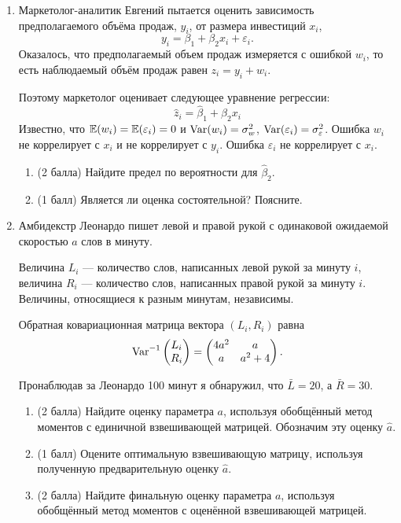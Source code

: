 \begin{enumerate}
    \item Маркетолог-аналитик Евгений пытается оценить зависимость предполагаемого объёма продаж, $y_i$, от размера инвестиций $x_i$,
\[    
y_i = \beta_1 + \beta_2 x_i + \varepsilon_i.
\]
Оказалось, что предполагаемый объем продаж измеряется с ошибкой $w_i$, то есть наблюдаемый объём продаж равен $z_i = y_i + w_i$.   

Поэтому маркетолог оценивает следующее уравнение регрессии:
\[ 
\hat z_i = \hat\beta_1 + \hat\beta_2 x_i
\]
Известно, что $\operatorname{\mathbb{E}}(w_i)=\operatorname{\mathbb{E}}(\varepsilon_i)=0$ и $\operatorname{Var}(w_i)=\sigma^2_w$, $\operatorname{Var}(\varepsilon_i)=\sigma^2_\varepsilon$. Ошибка $w_i$ не коррелирует с $x_i$ и не коррелирует с $y_i$. Ошибка $\varepsilon_i$ не коррелирует с $x_i$.

\begin{enumerate}
    \item (2 балла) Найдите предел по вероятности для $\hat{\beta}_2$. 
    \item (1 балл) Является ли оценка состоятельной? Поясните.
\end{enumerate}


\item Амбидекстр Леонардо пишет левой и правой рукой с одинаковой ожидаемой скоростью $a$ слов в минуту. 
    
    Величина $L_i$ — количество слов, написанных левой рукой за минуту $i$, величина $R_i$ — количество слов, написанных правой рукой за минуту $i$. Величины, относящиеся к разным минутам, независимы. 
    
    Обратная ковариационная матрица вектора $(L_i, R_i)$ равна
    \[
        \operatorname{Var}^{-1} \begin{pmatrix}
        L_i \\
        R_i \\
        \end{pmatrix} = 
        \begin{pmatrix}
        4a^2 & a \\
        a & a^2+4 \\
        \end{pmatrix}.
    \]
    
    Пронаблюдав за Леонардо 100 минут я обнаружил, что $\bar L = 20$, а $\bar R = 30$.
    
    \begin{enumerate}
        \item (2 балла) Найдите оценку параметра $a$, используя обобщённый метод моментов с единичной взвешивающей матрицей. Обозначим эту оценку $\hat a$. %
        \item (1 балл) Оцените оптимальную взвешивающую матрицу, используя полученную предварительную оценку $\hat a$. %
        \item (2 балла) Найдите финальную оценку параметра $a$, используя обобщённый метод моментов с оценённой взвешивающей матрицей. %
        


\end{enumerate}
\end{enumerate}
